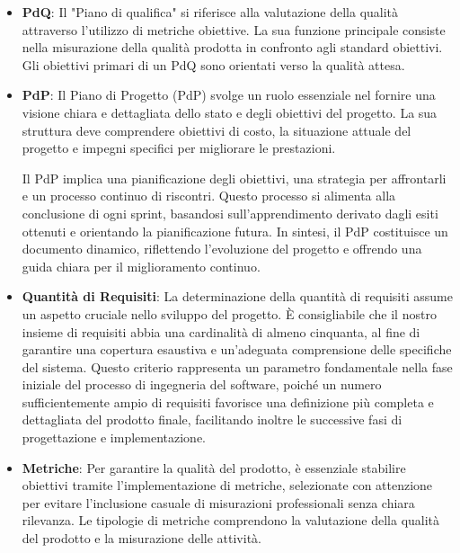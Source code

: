 \begin{itemize}
	\item 	\textbf{PdQ}:
	      Il "Piano di qualifica" si riferisce alla valutazione della qualità attraverso
	      l'utilizzo di metriche obiettive.
	      La sua funzione principale consiste nella misurazione della qualità prodotta in confronto
	      agli standard obiettivi.
	      Gli obiettivi primari di un PdQ sono orientati verso la qualità attesa.


	\item 	\textbf{PdP}:
	      Il Piano di Progetto (PdP) svolge un ruolo essenziale nel fornire una visione chiara e dettagliata
	      dello stato e degli obiettivi del progetto.
	      La sua struttura deve comprendere obiettivi di costo, la situazione attuale del progetto e impegni
	      specifici per migliorare le prestazioni.

	      Il PdP implica una pianificazione degli obiettivi, una strategia per affrontarli e un processo continuo di riscontri.
	      Questo processo si alimenta alla conclusione di ogni sprint, basandosi sull'apprendimento derivato
	      dagli esiti ottenuti e orientando la pianificazione futura.
	      In sintesi, il PdP costituisce un documento dinamico, riflettendo l'evoluzione del progetto e
	      offrendo una guida chiara per il miglioramento continuo.

	\item 	\textbf{Quantità di Requisiti}:
	      La determinazione della quantità di requisiti assume un aspetto cruciale nello sviluppo del progetto.
	      È consigliabile che il nostro insieme di requisiti abbia una cardinalità di almeno cinquanta,
	      al fine di garantire una copertura esaustiva e un'adeguata comprensione delle specifiche del sistema.
	      Questo criterio rappresenta un parametro fondamentale nella fase iniziale del processo di ingegneria del software,
	      poiché un numero sufficientemente ampio di requisiti favorisce una definizione più completa e dettagliata del prodotto finale,
	      facilitando inoltre le successive fasi di progettazione e implementazione.

	\item 	\textbf{Metriche}:
	      Per garantire la qualità del prodotto, è essenziale stabilire obiettivi tramite l'implementazione di metriche,
	      selezionate con attenzione per evitare l'inclusione casuale di misurazioni professionali senza chiara rilevanza.
	      Le tipologie di metriche comprendono la valutazione della qualità del prodotto e la misurazione delle attività.


\end{itemize}
